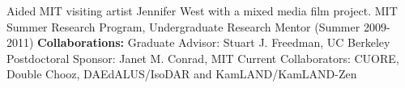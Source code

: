 Aided MIT visiting artist Jennifer West with a mixed media film project.
\newline\newline \noindent
MIT Summer Research Program, Undergraduate Research Mentor (Summer 2009-2011)
\newline\newline \noindent
{\bf  Collaborations:}
\newline \noindent
Graduate Advisor: Stuart J. Freedman, UC Berkeley
\newline \noindent
Postdoctoral Sponsor: Janet M. Conrad, MIT
\newline \noindent
Current Collaborators:
\newline \noindent
CUORE, Double Chooz, DAEdALUS/IsoDAR and KamLAND/KamLAND-Zen



